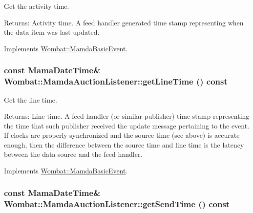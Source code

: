 Get the activity time. 

\begin{Desc}
\item[Returns:]Activity time. A feed handler generated time stamp representing when the data item was last updated. \end{Desc}


Implements \hyperlink{classWombat_1_1MamdaBasicEvent_b3810afc69474ef3b192ee4c9307e714}{Wombat::Mamda\-Basic\-Event}.\hypertarget{classWombat_1_1MamdaAuctionListener_e9c0fa0d65584e373f0e645566428a8e}{
\subsubsection[getLineTime]{\setlength{\rightskip}{0pt plus 5cm}const Mama\-Date\-Time\& Wombat::Mamda\-Auction\-Listener::get\-Line\-Time () const}}
\label{classWombat_1_1MamdaAuctionListener_e9c0fa0d65584e373f0e645566428a8e}


Get the line time. 

\begin{Desc}
\item[Returns:]Line time. A feed handler (or similar publisher) time stamp representing the time that such publisher received the update message pertaining to the event. If clocks are properly synchronized and the source time (see above) is accurate enough, then the difference between the source time and line time is the latency between the data source and the feed handler. \end{Desc}


Implements \hyperlink{classWombat_1_1MamdaBasicEvent_3fcc26fa1a6446bcec12b11ac74ed26d}{Wombat::Mamda\-Basic\-Event}.\hypertarget{classWombat_1_1MamdaAuctionListener_8258accabbd79b1ab817055b83aff153}{
\subsubsection[getSendTime]{\setlength{\rightskip}{0pt plus 5cm}const Mama\-Date\-Time\& Wombat::Mamda\-Auction\-Listener::get\-Send\-Time () const}}
\label{classWombat_1_1MamdaAuctionListener_8258accabbd79b1ab817055b83aff153}


